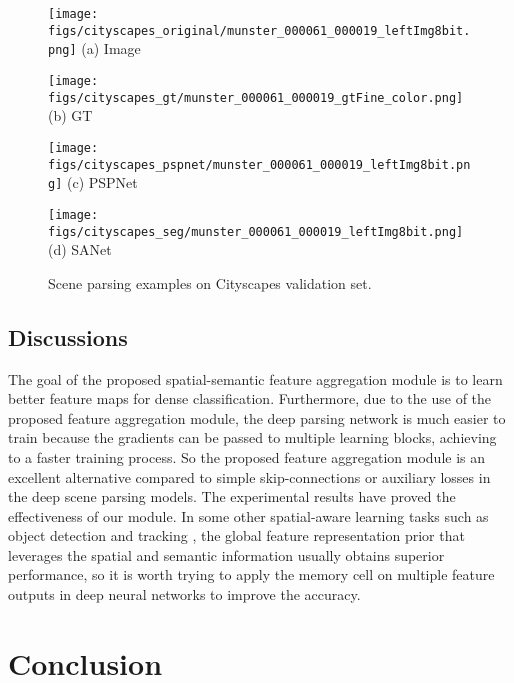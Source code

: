 \documentclass[10pt,twocolumn,twoside]{IEEEtran}
\begin{document}
\begin{figure*}[t]
\begin{minipage}{0.23\textwidth}\centering
	\texttt{[image: figs/cityscapes\_original/munster\_000061\_000019\_leftImg8bit.png]}
(a) Image 
\end{minipage}	
\begin{minipage}{0.23\textwidth}\centering
	\texttt{[image: figs/cityscapes\_gt/munster\_000061\_000019\_gtFine\_color.png]}
(b) GT
\end{minipage}
\begin{minipage}{0.23\textwidth}\centering	
	\texttt{[image: figs/cityscapes\_pspnet/munster\_000061\_000019\_leftImg8bit.png]} 
(c) PSPNet
\end{minipage}
\begin{minipage}{0.23\textwidth}\centering	
	\texttt{[image: figs/cityscapes\_seg/munster\_000061\_000019\_leftImg8bit.png]}
(d) SANet 
\end{minipage}	
\caption{Scene parsing examples on Cityscapes validation set.}
\label{FIG:CITYSCAPES}
\end{figure*}


\subsection{Discussions}

The goal of the proposed spatial-semantic feature aggregation module is to learn better feature maps for dense classification. Furthermore, due to the use of the proposed feature aggregation module, the deep parsing network is much easier to train because the gradients can be passed to multiple learning blocks, achieving to a faster training process. So the proposed feature aggregation module is an excellent alternative compared to simple skip-connections or auxiliary losses in the deep scene parsing models. The experimental results have proved the effectiveness of our module. In some other spatial-aware learning tasks such as object detection \cite{NIPS15:FASTER_RCNN,CVPR18:RN} and tracking \cite{CSR:TRACK}, the global feature representation prior that leverages the spatial and semantic information usually obtains superior performance, so it is worth trying to apply the memory cell on multiple feature outputs in deep neural networks to improve the accuracy.

\section{Conclusion}\label{SEC:CONCLUSION}
\end{document}
